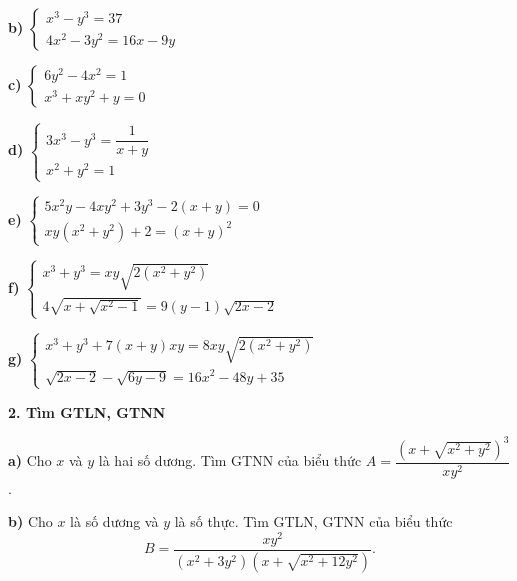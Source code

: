 \documentclass[12pt]{report}
\begin{document}
\vspace{0.3cm}
\noindent \textbf{b)} $\begin{cases} x^3 - y^3 = 37 \\ 4x^2 - 3y^2 = 16x - 9y \end{cases}$

\vspace{0.3cm}
\noindent \textbf{c)} $\begin{cases} 6y^2 - 4x^2 = 1 \\ x^3 + xy^2 + y = 0 \end{cases}$

\vspace{0.3cm}
\noindent \textbf{d)} $\begin{cases} 3x^3 - y^3 = \dfrac{1}{x+y} \\[8pt] x^2 + y^2 = 1 \end{cases}$

\vspace{0.3cm}
\noindent \textbf{e)} $\begin{cases} 5x^2y - 4xy^2 + 3y^3 - 2(x + y) = 0 \\ xy(x^2 + y^2) + 2 = (x + y)^2 \end{cases}$

\vspace{0.3cm}
\noindent \textbf{f)} $\begin{cases} x^3 + y^3 = xy\sqrt{2(x^2 + y^2)} \\ 4\sqrt{x + \sqrt{x^2 - 1}} = 9(y - 1)\sqrt{2x - 2} \end{cases}$

\vspace{0.3cm}
\noindent \textbf{g)} $\begin{cases} x^3 + y^3 + 7(x + y)xy = 8xy\sqrt{2(x^2 + y^2)} \\ \sqrt{2x - 2} - \sqrt{6y - 9} = 16x^2 - 48y + 35 \end{cases}$

\vspace{0.5cm}
\noindent \textbf{2. Tìm GTLN, GTNN}

\vspace{0.3cm}
\noindent \textbf{a)} Cho $x$ và $y$ là hai số dương. Tìm GTNN của biểu thức $A = \dfrac{\left(x + \sqrt{x^2 + y^2}\right)^3}{xy^2}$.

\vspace{0.3cm}
\noindent \textbf{b)} Cho $x$ là số dương và $y$ là số thực. Tìm GTLN, GTNN của biểu thức
\[
B = \dfrac{xy^2}{(x^2 + 3y^2)\left(x + \sqrt{x^2 + 12y^2}\right)}.
\]
\end{document}
